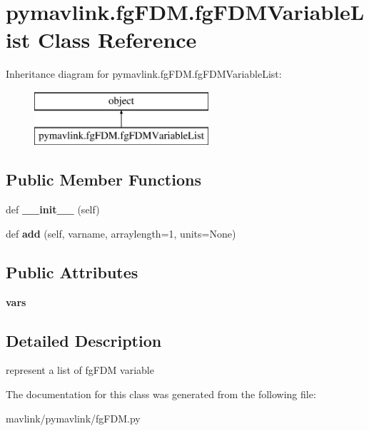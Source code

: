 \hypertarget{classpymavlink_1_1fgFDM_1_1fgFDMVariableList}{}\section{pymavlink.\+fg\+F\+D\+M.\+fg\+F\+D\+M\+Variable\+List Class Reference}
\label{classpymavlink_1_1fgFDM_1_1fgFDMVariableList}
Inheritance diagram for pymavlink.\+fg\+F\+D\+M.\+fg\+F\+D\+M\+Variable\+List\+:\begin{figure}[H]
\begin{center}
\leavevmode
\includegraphics[height=2.000000cm]{classpymavlink_1_1fgFDM_1_1fgFDMVariableList}
\end{center}
\end{figure}
\subsection*{Public Member Functions}
\begin{DoxyCompactItemize}
\item 
\mbox{\label{classpymavlink_1_1fgFDM_1_1fgFDMVariableList_a99f6215e97c021f81f6b98889e9a1dc6}} 
def {\bfseries \+\_\+\+\_\+init\+\_\+\+\_\+} (self)
\item 
\mbox{\label{classpymavlink_1_1fgFDM_1_1fgFDMVariableList_a1bc0fcbbced32379e9a56d792e9d9807}} 
def {\bfseries add} (self, varname, arraylength=1, units=None)
\end{DoxyCompactItemize}
\subsection*{Public Attributes}
\begin{DoxyCompactItemize}
\item 
\mbox{\label{classpymavlink_1_1fgFDM_1_1fgFDMVariableList_a6c727c14aa93c3f24e8af01ed41ff4af}} 
{\bfseries vars}
\end{DoxyCompactItemize}


\subsection{Detailed Description}
\begin{DoxyVerb}represent a list of fgFDM variable\end{DoxyVerb}
 

The documentation for this class was generated from the following file\+:\begin{DoxyCompactItemize}
\item 
mavlink/pymavlink/fg\+F\+D\+M.\+py\end{DoxyCompactItemize}
